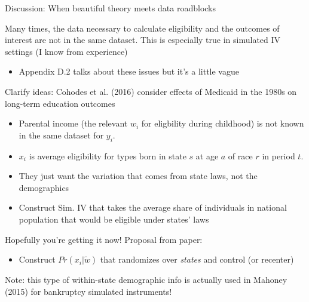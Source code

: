 \documentclass[notes,11pt, aspectratio=169]{beamer}
\newenvironment{wideitemize}{\itemize\addtolength{\itemsep}{10pt}}{\enditemize}
\begin{document}
\begin{frame}{Discussion: When beautiful theory  meets data roadblocks}
  \begin{wideitemize}
  \item Many times, the data necessary to calculate eligibility and
    the outcomes of interest are not in the same dataset. This is
    especially true in simulated IV settings (I know from experience)
    \begin{itemize}
    \item Appendix D.2 talks about these issues but it's a little vague
    \end{itemize}
  \item Clarify ideas: Cohodes et al. (2016) consider effects of
    Medicaid in the 1980s on long-term education outcomes
    \begin{itemize}
    \item Parental income (the relevant $w_{i}$ for eligbility during childhood) is not known in the same dataset for $y_{i}$.
    \item $x_{i}$ is average eligibility for types born in state $s$ at age $a$ of race $r$ in period $t$.
    \item They just want the variation that comes from state laws, not the demographics
    \item Construct Sim. IV that takes the average share of
      individuals in national population that would be eligible under
      states' laws
    \end{itemize}
  \item Hopefully you're getting it now! Proposal from paper:
    \begin{itemize}
    \item Construct $Pr(x_{i} | \tilde{w})$ that randomizes over \emph{states} and control (or recenter)
    \end{itemize}
  \item Note: this type of within-state demographic info is actually
    used in Mahoney (2015) for bankruptcy simulated instruments!
  \end{wideitemize}
\end{frame}
\end{document}
